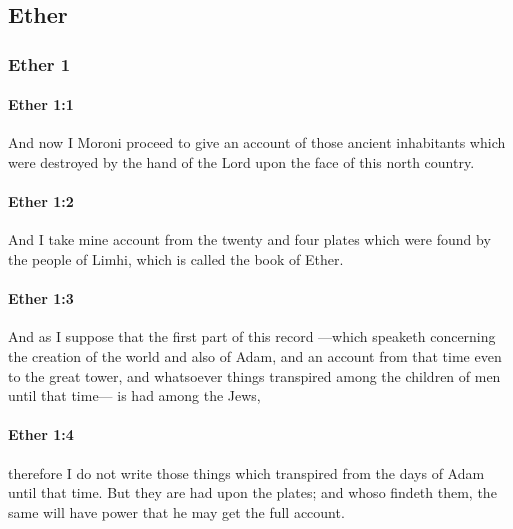 \subsection{Ether}
	\label{ETHER}

	\subsubsection{Ether 1} %
		\label{ETHER-1}
		
		\paragraph{Ether 1:1} %
			\label{ETHER-1-1}

			And now I Moroni proceed to give an account
			of those ancient inhabitants which were destroyed by the hand of the Lord
			upon the face of this north country.

		\paragraph{Ether 1:2} %
			\label{ETHER-1-2}

			And I take mine account from the twenty and four plates
			which were found by the people of Limhi,
			which is called the book of Ether.

		\paragraph{Ether 1:3} %
			\label{ETHER-1-3}

			And as I suppose that the first part of this record
			---which speaketh concerning the creation of the world and also of Adam,
			and an account from that time even to the great tower,
			and whatsoever things transpired among the children of men until that time---
			is had among the Jews,

		\paragraph{Ether 1:4} %
			\label{ETHER-1-4}

			therefore I do not write those things
			which transpired from the days of Adam until that time.
			But they are had upon the plates;
			and whoso findeth them,
			the same will have power that he may get the full account.

